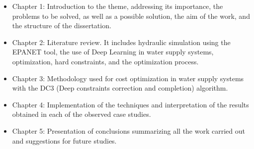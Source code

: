 \begin{itemize}

\item Chapter 1: Introduction to the theme, addressing its importance, the problems to be solved, as well as a possible solution, the aim of the work, and the structure of the dissertation.

\item Chapter 2: Literature review. It includes hydraulic simulation using the EPANET tool, the use of Deep Learning in water supply systems, optimization, hard constraints, and the optimization process.

\item Chapter 3: Methodology used for cost optimization in water supply systems with the DC3 (Deep constraints correction and completion) algorithm.

\item Chapter 4: Implementation of the techniques and interpretation of the results obtained in each of the observed case studies.

\item Chapter 5: Presentation of conclusions summarizing all the work carried out and suggestions for future studies.

\end{itemize}
